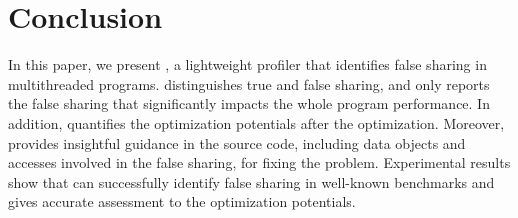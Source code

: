 \section{Conclusion}
\label{sec:conclusion}

In this paper, we present \cheetah{}, a lightweight profiler that identifies false sharing in multithreaded programs. \cheetah{} distinguishes true and false sharing, and only reports the false sharing that significantly impacts the whole program performance. In addition, \cheetah{} quantifies the optimization potentials after the optimization. Moreover, \cheetah{} provides insightful guidance in the source code, including data objects and accesses involved in the false sharing, for fixing the problem. Experimental results show that \cheetah{} can successfully identify false sharing in well-known benchmarks and gives accurate assessment to the optimization potentials.

